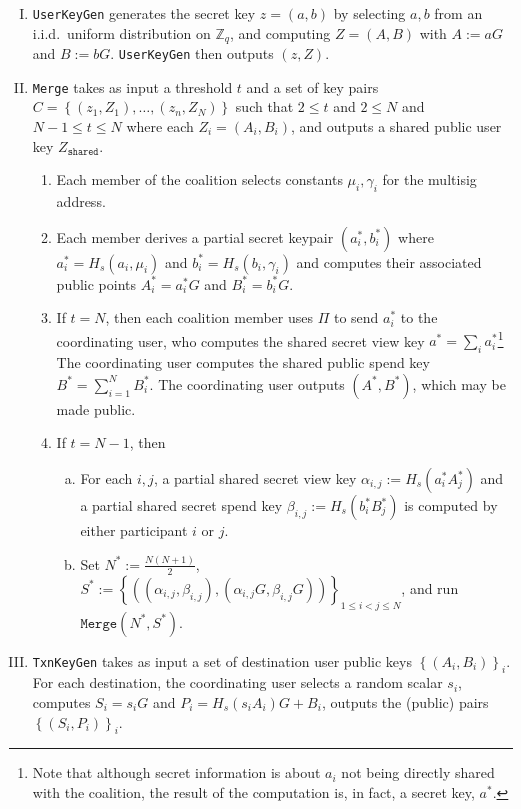 \documentclass{mrl}
\theoremstyle{definition}
\begin{document}
\begin{enumerate}[(I)]
\item \texttt{UserKeyGen} generates the secret key $z=(a,b)$ by selecting $a,b$ from an i.i.d.\ uniform distribution on $\mathbb{Z}_q$, and computing $Z=(A,B)$ with $A:=aG$ and $B:=bG$. \texttt{UserKeyGen} then outputs $(z,Z)$.

\item \texttt{Merge} takes as input a threshold $t$ and a set of key pairs $C=\left\{(z_1,Z_1), \ldots, (z_n,Z_N)\right\}$  such that $2 \leq t$ and $2 \leq N$ and $N-1 \leq t \leq N$ where each $Z_i = (A_i,B_i)$, and outputs a shared public user key $Z_{\texttt{shared}}$.
\begin{enumerate}[(1)]
\item Each member of the coalition selects constants $\mu_i, \gamma_i$ for the multisig address. 
\item Each member derives a partial secret keypair $(a^*_i, b^*_i)$ where $a^*_i = H_s(a_i, \mu_i)$ and $b^*_i = H_s(b_i, \gamma_i)$ and computes their associated public points $A^*_i=a^*_i G$ and $B^*_i = b^*_i G$. 
\item If $t=N$, then each coalition member uses $\Pi$ to send $a^*_i$ to the coordinating user, who computes the shared secret view key $a^* = \sum_i a^*_i$\footnote{Note that although secret information is about $a_i$ not being directly shared with the coalition, the result of the computation is, in fact, a secret key, $a^*$.} The coordinating user computes the shared public spend key $B^* = \sum_{i=1}^{N} B^*_i$. The coordinating user outputs $(A^*, B^*)$, which may be made public.
\item If $t=N-1$, then 
\begin{enumerate}[(a)]
\item For each $i,j$, a partial shared secret view key $\alpha_{i,j} := H_s(a^*_iA^*_j)$ and a partial shared secret spend key $\beta_{i,j} := H_s(b^*_iB^*_j)$ is computed by either participant $i$ or $j$.
\item Set $N^* := \frac{N(N+1)}{2}$, $S^* := \left\{((\alpha_{i,j},\beta_{i,j}), (\alpha_{i,j}G, \beta_{i,j}G))\right\}_{1 \leq i < j \leq N}$, and run $\texttt{Merge}(N^*, S^*)$.
\end{enumerate}
\end{enumerate}

\item \texttt{TxnKeyGen} takes as input a set of destination user public keys $\left\{(A_i,B_i)\right\}_{i}$. For each destination, the coordinating user selects a random scalar $s_i$, computes $S_i=s_iG$ and $P_i = H_s(s_iA_i)G + B_i$, outputs the (public) pairs $\left\{(S_i,P_i)\right\}_i$.%


\end{enumerate}
\end{document}

